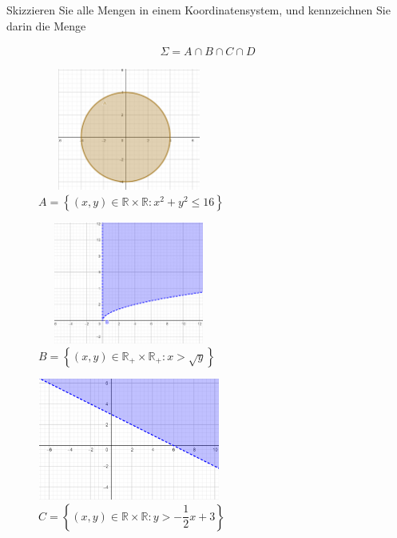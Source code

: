 Skizzieren Sie alle Mengen in einem Koordinatensystem, und kennzeichnen 
Sie darin die Menge 

\begin{eqnarray}
	\Sigma = A \cap B \cap C \cap D
\end{eqnarray}

	\begin{figure}[h]
		\centering
		\includegraphics[width=6cm,height=4cm]{MengeA.png}
		\caption{$A = \left\{ \left(x,y \right) \in \mathbb{R} \times \mathbb{R}: x^2 +y^2 \le 16 \right\}$}
		\label{fig:Menge A}
	\end{figure}

	\begin{figure}[h]
	\centering
	\includegraphics[width=6cm,height=4cm]{MengeB.png}
	\caption{$B=\left\{ \left(x,y \right) \in \mathbb{R_{+}} \times \mathbb{R_{+}}: x > \sqrt{y} \right\}$}
	\label{fig:Menge B}
\end{figure}

\begin{figure}[h]
	\centering
	\includegraphics[width=6cm,height=4cm]{MengeC.png}
	\caption{$C = \left\{ \left(x,y \right) \in \mathbb{R} \times \mathbb{R}: y > -\dfrac{1}{2}x+3 \right\}$}
	\label{fig:Menge C}
\end{figure}

